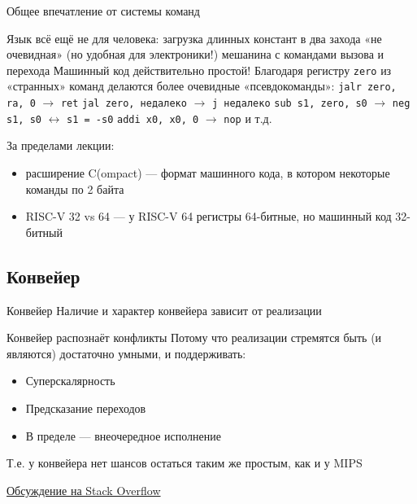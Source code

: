 \documentclass[xetex,aspectratio=43]{beamer}
\begin{document}
\begin{frame}{Общее впечатление от системы команд}
    \begin{outline}[itemize]
        \1 Язык всё ещё не для человека:
            \2 загрузка длинных констант в два захода
            \2 «не очевидная» (но удобная для электроники!) мешанина с командами вызова и перехода
        \1 Машинный код действительно простой!
        \1 Благодаря регистру \texttt{zero} из «странных» команд делаются более очевидные «псевдокоманды»:
            \2 \texttt{jalr zero, ra, 0} $\rightarrow$ \texttt{ret}
            \2 \texttt{jal zero, недалеко} $\rightarrow$ \texttt{j недалеко}
            \2 \texttt{sub s1, zero, s0} $\rightarrow$ \texttt{neg s1, s0} $\leftrightarrow$ \texttt{s1 = -s0}
            \2 \texttt{addi x0, x0, 0} $\rightarrow$ \texttt{nop}
            \2 и т.д.
    \end{outline}
    \pause
    \alert{За пределами лекции:}
    \begin{itemize}
        \item расширение C(ompact) --- формат машинного кода, в котором некоторые команды по 2 байта
        \item RISC-V 32 vs 64 --- у RISC-V 64 регистры 64-битные, но машинный код 32-битный
    \end{itemize}

\end{frame}

\subsection{Конвейер}

\begin{frame}{Конвейер}
    Наличие и характер конвейера зависит от реализации
    \pause
    \begin{block}{Конвейер распознаёт конфликты}
        Потому что реализации стремятся быть (и являются) достаточно умными, и поддерживать:
        \begin{itemize}
            \tightlist
            \item Суперскалярность
            \item Предсказание переходов
            \item В пределе --- внеочередное исполнение
        \end{itemize}
        Т.е. у конвейера нет шансов остаться таким же простым, как и у MIPS
    \end{block}
    \pause
    \href{https://stackoverflow.com/a/54725021}{Обсуждение на Stack Overflow}
\end{frame}
\end{document}

